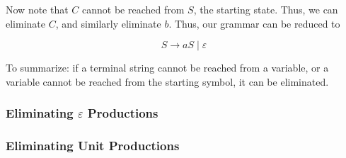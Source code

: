 Now note that \(C\) cannot be reached from \(S\), the starting state. Thus, we can eliminate \(C\), and similarly eliminate \(b\). Thus, our grammar can be reduced to 

\[S \to aS\mid \varepsilon \]

To summarize: if a terminal string cannot be reached from a variable, or a variable cannot be reached from the starting symbol, it can be eliminated.

\subsubsection{Eliminating \(\varepsilon \) Productions}\label{subsubsec:eliminating-epsilon-productions}
\subsubsection{Eliminating Unit Productions}\label{subsubsec:eliminating-unit-productions}